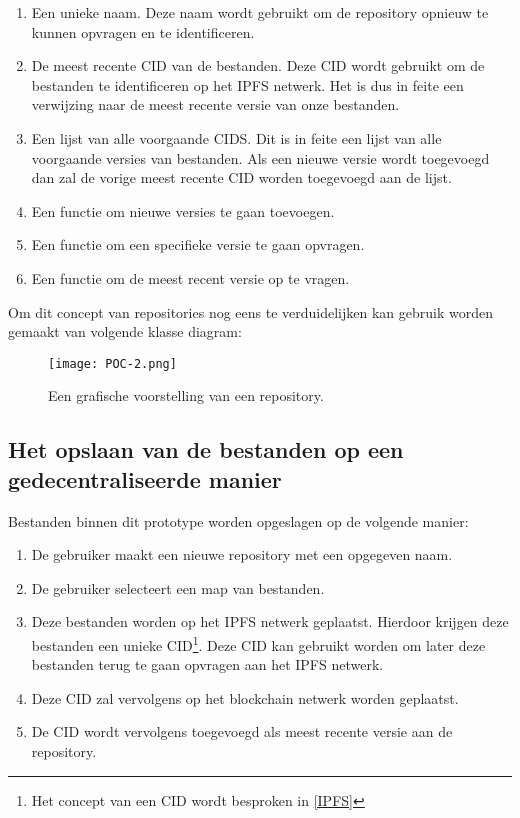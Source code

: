 \begin{enumerate}
\item Een unieke naam. Deze naam wordt gebruikt om de repository opnieuw te kunnen opvragen en te identificeren.\\
\item De meest recente CID van de bestanden. Deze CID wordt gebruikt om de bestanden te identificeren op het IPFS netwerk. Het is dus in feite een verwijzing naar de meest recente versie van onze bestanden.\\
\item Een lijst van alle voorgaande CIDS. Dit is in feite een lijst van alle voorgaande versies van bestanden. Als een nieuwe versie wordt toegevoegd dan zal de vorige meest recente CID worden toegevoegd aan de lijst.\\
\item Een functie om nieuwe versies te gaan toevoegen.
\item Een functie om een specifieke versie te gaan opvragen.
\item Een functie om de meest recent versie op te vragen.
\end{enumerate}

Om dit concept van repositories nog eens te verduidelijken kan gebruik worden gemaakt van volgende klasse diagram:

\begin{figure}[h!]
\centering
\texttt{[image: POC-2.png]}
\caption[POC Repository]{Een grafische voorstelling van een repository.}
\end{figure}


\subsection{Het opslaan van de bestanden op een gedecentraliseerde manier}
Bestanden binnen dit prototype worden opgeslagen op de volgende manier:

\begin{enumerate}
\item De gebruiker maakt een nieuwe repository met een opgegeven naam.\\
\item De gebruiker selecteert een map van bestanden.\\
\item Deze bestanden worden op het IPFS netwerk geplaatst. Hierdoor krijgen deze bestanden een unieke CID\footnote{Het concept van een CID wordt besproken in \ref{IPFS}}. Deze CID kan gebruikt worden om later deze bestanden terug te gaan opvragen aan het IPFS netwerk.\\
\item Deze CID zal vervolgens op het blockchain netwerk worden geplaatst.\\
\item De CID wordt vervolgens toegevoegd als meest recente versie aan de repository.
\end{enumerate}

